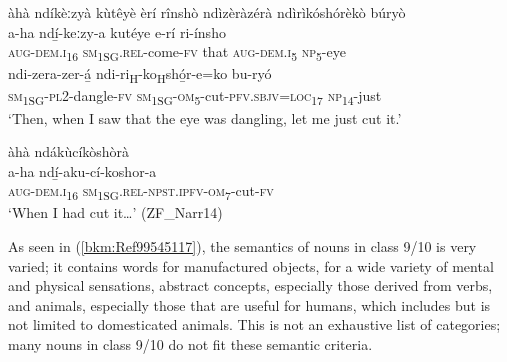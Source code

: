 \ea
\label{bkm:Ref98512351}
àhà ndíkèːzyà kùtêyè èrí rînshò ndìzèràzérà ndìrìkóshórèkò búryò\\
\gll a-ha    ndí̲-keːzy-a    kutéye    e-rí     ri-ínsho\\
\textsc{aug}-\textsc{dem}.\textsc{i}\textsubscript{16} \textsc{sm}\textsubscript{1SG}.\textsc{rel}-come-\textsc{fv}  that    \textsc{aug}-\textsc{dem}.\textsc{i}\textsubscript{5} \textsc{np}\textsubscript{5}-eye\\
ndi-zera-zer-á̲    ndi-ri\textsubscript{H}-ko\textsubscript{H}shó̲r-e=ko    bu-ryó\\
\textsc{sm}\textsubscript{1SG}-\textsc{pl}2-dangle-\textsc{fv}  \textsc{sm}\textsubscript{1SG}-\textsc{om}\textsubscript{5}-cut-\textsc{pfv}.\textsc{sbjv}=\textsc{loc}\textsubscript{17}  \textsc{np}\textsubscript{14}-just\\
\glt ‘Then, when I saw that the eye was dangling, let me just cut it.’
\z

\ea
\label{bkm:Ref99545055}
àhà    ndákùcíkòshòrà\\
\gll a-ha    ndí̲-aku-cí-koshor-a\\
\textsc{aug}-\textsc{dem}.\textsc{i}\textsubscript{16}  \textsc{sm}\textsubscript{1SG}.\textsc{rel}-\textsc{npst}.\textsc{ipfv}-\textsc{om}\textsubscript{7}-cut-\textsc{fv}\\
\glt ‘When I had cut it…’ (ZF\_Narr14)
\z

As seen in (\ref{bkm:Ref99545117}), the semantics of nouns in class 9/10 is very varied; it contains words for manufactured objects, for a wide variety of mental and physical sensations, abstract concepts, especially those derived from verbs, and animals, especially those that are useful for humans, which includes but is not limited to domesticated animals. This is not an exhaustive list of categories; many nouns in class 9/10 do not fit these semantic criteria.

